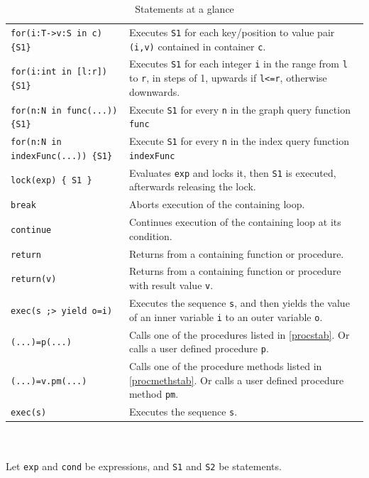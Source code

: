 \begin{table}[htbp]
\begin{minipage}{\linewidth}
\begin{tabularx}{\linewidth}{|lX|}
\texttt{for(i:T->v:S in c) \{S1\} } & Executes \texttt{S1} for each key/position to value pair \texttt{(i,v)} contained in container \texttt{c}.\\
\texttt{for(i:int in [l:r]) \{S1\} } & Executes \texttt{S1} for each integer \texttt{i} in the range from \texttt{l} to \texttt{r}, in steps of 1, upwards if \texttt{l<=r}, otherwise downwards.\\
\texttt{for(n:N in func(...)) \{S1\}}	& Execute \texttt{S1} for every \texttt{n} in the graph query function \texttt{func}\\
\texttt{for(n:N in indexFunc(...)) \{S1\}}	& Execute \texttt{S1} for every \texttt{n} in the index query function \texttt{indexFunc}\\
\texttt{lock(exp) \{ S1 \}} & Evaluates \texttt{exp} and locks it, then \texttt{S1} is executed, afterwards releasing the lock.\\
\hline
\texttt{break} & Aborts execution of the containing loop.\\
\texttt{continue} & Continues execution of the containing loop at its condition.\\
\texttt{return} & Returns from a containing function or procedure.\\
\texttt{return(v)} & Returns from a containing function or procedure with result value \texttt{v}.\\
\hline
\texttt{exec(s ;> yield o=i)} & Executes the sequence \texttt{s}, and then yields the value of an inner variable \texttt{i} to an outer variable \texttt{o}.\\
\hline
\texttt{(...)=p(...)}	& Calls one of the procedures listed in \ref{procstab}. Or calls a user defined procedure \texttt{p}.\\
\texttt{(...)=v.pm(...)}	& Calls one of the procedure methods listed in \ref{procmethstab}. Or calls a user defined procedure method \texttt{pm}.\\
\hline
\texttt{exec(s)} & Executes the sequence \texttt{s}.\\
\hline
\end{tabularx}
\end{minipage}\\
\\ 
{\small Let \texttt{exp} and \texttt{cond} be expressions, and \texttt{S1} and \texttt{S2} be statements.}
\caption{Statements at a glance}
\label{statementstab}
\end{table}



